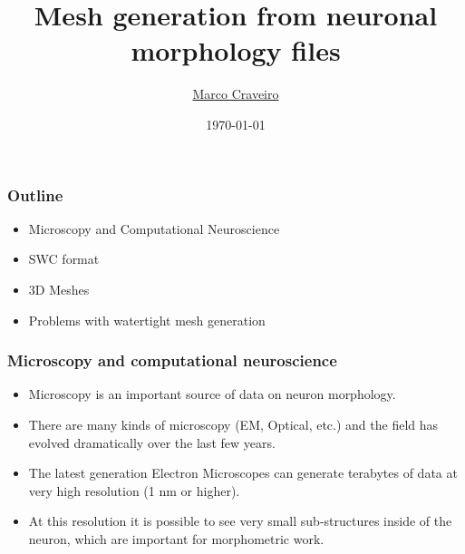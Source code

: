 \documentclass{beamer}
\title{Mesh generation from neuronal morphology files}
\author{
  \texorpdfstring
      {\href{mailto:marco.craveiro@gmail.com}{Marco Craveiro}}
      {Marco Craveiro}
}
\date{\today}
\begin{document}
\begin{frame}
\titlepage
\end{frame}

\begin{frame}
\frametitle{Outline}
\begin{itemize}
\item Microscopy and Computational Neuroscience
\pause
\item SWC format
\pause
\item 3D Meshes
\pause
\item Problems with watertight mesh generation
\pause
\end{itemize}
\end{frame}

\begin{frame}
\frametitle{Microscopy and computational neuroscience}

\begin{itemize}

\item Microscopy is an important source of data on neuron morphology.
\pause
\item There are many kinds of microscopy (EM, Optical, etc.) and the
  field has evolved dramatically over the last few years.
\pause
\item The latest generation Electron Microscopes can generate
  terabytes of data at very high resolution (1 nm or higher).
\pause
\item At this resolution it is possible to see very small
  sub-structures inside of the neuron, which are important for
  morphometric work.

\end{itemize}

\end{frame}
\end{document}
